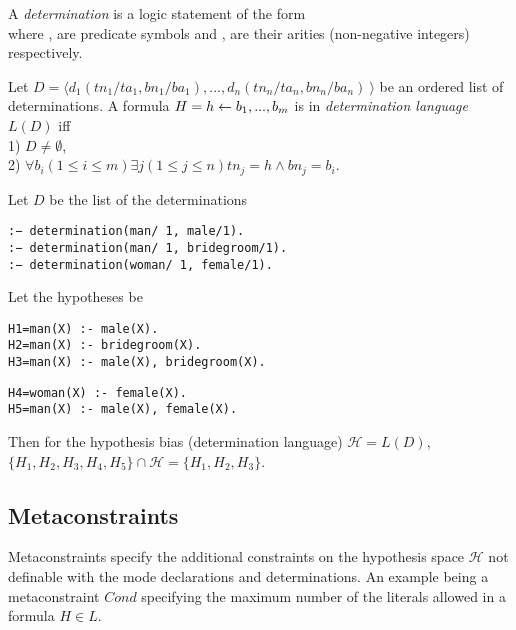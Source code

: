 \begin{defn}\cite{aleph2007}
A \emph{determination} is a logic statement of the form\\
where ,  are predicate symbols and
,  are their arities (non-negative integers) respectively.
\end{defn}

\begin{defn}\label{definition_determination_language}
Let $D=\langle d_1(tn_1/ta_1, bn_1/ba_1), ..., d_n(tn_n/ta_n, bn_n/ba_n)\ \rangle$ be an ordered list of determinations. A formula $H=h \leftarrow b_1, ..., b_m$ is in \emph{determination language} $L(D)$ iff\\
1) $D \not=\emptyset$,\\
2) $\forall b_i (1 \le i \le m) \exists j (1 \le j \le n) tn_j=h \land bn_j=b_i$.
\end{defn}

\begin{exmp}
Let $D$ be the list of the determinations
\begin{lstlisting}
:− determination(man/ 1, male/1).
:− determination(man/ 1, bridegroom/1).
:− determination(woman/ 1, female/1).
\end{lstlisting}
Let the hypotheses be

\begin{minipage}[t]{.50\textwidth}
\begin{lstlisting}
H1=man(X) :- male(X).
H2=man(X) :- bridegroom(X).
H3=man(X) :- male(X), bridegroom(X).
\end{lstlisting}
\end{minipage}
\begin{minipage}[t]{.50\textwidth}
\begin{lstlisting}
H4=woman(X) :- female(X).
H5=man(X) :- male(X), female(X).
\end{lstlisting}
\end{minipage}

Then for the hypothesis bias (determination language) $\mathcal{H}=L(D)$,
$\{H_1, H_2, H_3, H_4, H_5\} \cap \mathcal{H}=\{H_1, H_2, H_3\}$.
\end{exmp}

\subsection{Metaconstraints}\label{bias_metaconstraints}
Metaconstraints specify the additional constraints on the hypothesis space $\mathcal{H}$ not definable with the mode declarations and determinations.
An example being a metaconstraint $Cond$ specifying the maximum number of the literals allowed in a formula $H \in L$.


